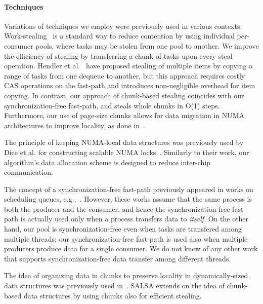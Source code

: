 \paragraph{Techniques}
Variations of techniques we employ were previously used in various contexts. 
Work-stealing~\cite{Blumofe:1999:SMC:324133.324234} is a standard way to reduce
contention by using individual per-consumer pools, where tasks may be stolen from one pool to
another. 
We improve the efficiency of stealing by transferring a chunk of tasks upon every steal
operation. Hendler et al.~\cite{Hendler:2002:NSW:571825.571876} have proposed stealing of multiple
items by copying a range of tasks from one dequeue to another, but this approach requires
costly CAS operations on the fast-path and introduces non-negligible overhead for item copying. In
contrast, our approach of chunk-based stealing coincides with our synchronization-free fast-path,
and steals whole chunks in O(1) steps. Furthermore, our use of page-size chunks allows for data
migration in NUMA architectures to improve locality, as done in~\cite{Blagodurov:2011:CNC:2002181.2002182}.

The principle of keeping NUMA-local data structures was previously used 
by Dice et al. for constructing scalable NUMA locks~\cite{Dice:2011:FNL:1989493.1989502}. 
Similarly to their work, our algorithm's data allocation scheme is designed to reduce inter-chip communication. 

The concept of a synchronization-free fast-path previously
appeared in works on scheduling queues,
e.g.,~\cite{Arora:1998:TSM:277651.277678,Hendler:2006:DNW:1160290.1160294}. However, these works
assume that the same process is both the producer and the consumer, and hence the
synchronization-free fast-path is actually used only when a process transfers data to \emph{itself}.
On the other hand, our pool is synchronization-free even when tasks are transfered among multiple
threads; our synchronization-free fast-path is used also when multiple producers produce data for
a single consumer. We do not know of any other work that supports synchronization-free data
transfer among different threads.


The idea of organizing data in chunks to preserve locality in dynamically-sized data
structures was previously used
in~\cite{Braginsky:2011:LLL:1946143.1946153, Gidenstam:2010:CLQ:1940234.1940266,
Hendler:2006:DNW:1160290.1160294, Sundell:2011:LAC:1989493.1989550}. SALSA extends on the idea of
chunk-based data structures by using chunks also for efficient stealing.